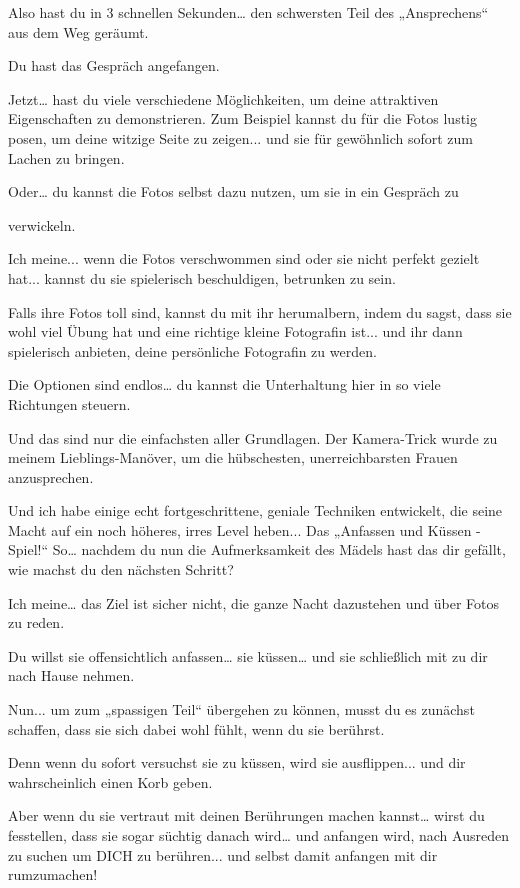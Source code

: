 Also hast du in 3 schnellen Sekunden… den schwersten Teil des „Ansprechens“ aus dem Weg 
geräumt.

Du hast das Gespräch angefangen.

Jetzt… hast du viele verschiedene Möglichkeiten, um deine attraktiven Eigenschaften zu demonstrieren.
Zum Beispiel kannst du für die Fotos lustig posen, um deine witzige Seite zu
zeigen... und sie für gewöhnlich sofort zum Lachen zu bringen.

Oder… du kannst die Fotos selbst dazu nutzen, um sie in ein Gespräch zu

verwickeln.

Ich meine... wenn die Fotos verschwommen sind oder sie nicht perfekt
gezielt hat... kannst du sie spielerisch beschuldigen, betrunken zu sein.

Falls ihre Fotos toll sind, kannst du mit ihr herumalbern, indem du sagst,
dass sie wohl viel Übung hat und eine richtige kleine Fotografin ist... und ihr
dann spielerisch anbieten, deine persönliche Fotografin zu werden.

Die Optionen sind endlos… du kannst die Unterhaltung hier in so viele
Richtungen steuern.

Und das sind nur die einfachsten aller Grundlagen. Der Kamera-Trick wurde zu meinem Lieblings-Manöver, um die hübschesten, unerreichbarsten Frauen anzusprechen.

Und ich habe einige echt fortgeschrittene, geniale Techniken entwickelt, die seine Macht auf ein noch höheres, irres Level heben...
Das „Anfassen und Küssen - Spiel!“
So… nachdem du nun die Aufmerksamkeit des Mädels hast das dir gefällt, wie machst du den nächsten Schritt?

Ich meine… das Ziel ist sicher nicht, die ganze Nacht dazustehen und über Fotos zu reden.

Du willst sie offensichtlich anfassen… sie küssen… und sie schließlich mit zu dir nach Hause nehmen.

Nun... um zum „spassigen Teil“ übergehen zu können, musst du es zunächst schaffen, dass sie sich dabei wohl fühlt, wenn du sie berührst.

Denn wenn du sofort versuchst sie zu küssen, wird sie ausflippen... und dir wahrscheinlich einen Korb geben.

Aber wenn du sie vertraut mit deinen Berührungen machen kannst… wirst du fesstellen, dass sie sogar süchtig danach wird… und anfangen wird, nach Ausreden zu suchen um DICH zu berühren... und selbst damit anfangen mit dir rumzumachen!


